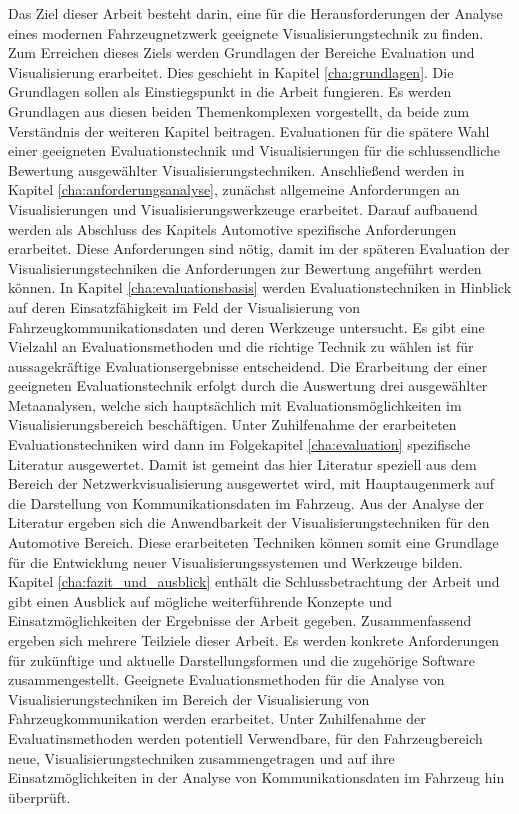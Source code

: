 \documentclass[draft=false
              ,paper=a4
              ,twoside=false
              ,fontsize=11pt
              ,headsepline
              ,BCOR10mm
              ,DIV11
              ]{scrbook}
\begin{document}
Das Ziel dieser Arbeit besteht darin, eine für die Herausforderungen der Analyse eines modernen Fahrzeugnetzwerk geeignete Visualisierungstechnik zu finden. Zum Erreichen dieses Ziels werden Grundlagen der Bereiche Evaluation und Visualisierung erarbeitet. Dies geschieht in Kapitel \ref{cha:grundlagen}. Die Grundlagen sollen als Einstiegspunkt in die Arbeit fungieren. Es werden Grundlagen aus diesen beiden Themenkomplexen vorgestellt, da beide zum Verständnis der weiteren Kapitel beitragen. Evaluationen für die spätere Wahl einer geeigneten Evaluationstechnik und Visualisierungen für die schlussendliche Bewertung ausgewählter Visualisierungstechniken. Anschließend werden in Kapitel \ref{cha:anforderungsanalyse}, zunächst allgemeine Anforderungen an Visualisierungen und Visualisierungswerkzeuge erarbeitet. Darauf aufbauend werden als Abschluss des Kapitels Automotive spezifische Anforderungen erarbeitet. Diese Anforderungen sind nötig, damit im der späteren Evaluation der Visualisierungstechniken die Anforderungen zur Bewertung angeführt werden können.
In Kapitel \ref{cha:evaluationsbasis} werden Evaluationstechniken in Hinblick auf deren Einsatzfähigkeit im Feld der Visualisierung von Fahrzeugkommunikationsdaten und deren Werkzeuge untersucht. Es gibt eine Vielzahl an Evaluationsmethoden und die richtige Technik zu wählen ist für aussagekräftige Evaluationsergebnisse entscheidend. Die Erarbeitung der einer geeigneten Evaluationstechnik erfolgt durch die Auswertung drei ausgewählter Metaanalysen, welche sich hauptsächlich mit Evaluationsmöglichkeiten im Visualisierungsbereich beschäftigen. Unter Zuhilfenahme der erarbeiteten Evaluationstechniken wird dann im Folgekapitel \ref{cha:evaluation} spezifische Literatur ausgewertet. Damit ist gemeint das hier Literatur speziell aus dem Bereich der Netzwerkvisualisierung ausgewertet wird, mit Hauptaugenmerk auf die Darstellung von Kommunikationsdaten im Fahrzeug. Aus der Analyse der Literatur ergeben sich die Anwendbarkeit der Visualisierungstechniken für den Automotive Bereich. Diese erarbeiteten Techniken können somit eine Grundlage für die Entwicklung neuer Visualisierungssystemen und Werkzeuge bilden. Kapitel \ref{cha:fazit_und_ausblick} enthält die Schlussbetrachtung der Arbeit und gibt einen Ausblick auf mögliche weiterführende Konzepte und Einsatzmöglichkeiten der Ergebnisse der Arbeit gegeben. 
Zusammenfassend ergeben sich mehrere Teilziele dieser Arbeit. Es werden konkrete Anforderungen für zukünftige und aktuelle Darstellungsformen und die zugehörige Software zusammengestellt. Geeignete Evaluationsmethoden für die Analyse von Visualisierungstechniken im Bereich der Visualisierung von Fahrzeugkommunikation werden erarbeitet. Unter Zuhilfenahme der Evaluatinsmethoden werden potentiell Verwendbare, für den Fahrzeugbereich neue, Visualisierungstechniken zusammengetragen und auf ihre Einsatzmöglichkeiten in der Analyse von Kommunikationsdaten im Fahrzeug hin überprüft.
\end{document}
